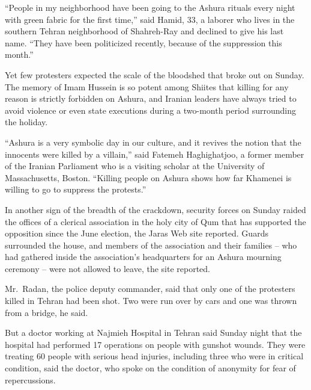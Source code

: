 ﻿\documentclass[12pt]{article}
\begin{document}
``People in my neighborhood have been going to the Ashura rituals every night with green fabric for
the first time,'' said Hamid, 33, a laborer who lives in the southern Tehran neighborhood of
Shahreh-Ray and declined to give his last name. ``They have been politicized recently, because of
the suppression this month.''

Yet few protesters expected the scale of the bloodshed that broke out on Sunday. The memory of Imam
Hussein is so potent among Shiites that killing for any reason is strictly forbidden on Ashura, and
Iranian leaders have always tried to avoid violence or even state executions during a two-month
period surrounding the holiday.

``Ashura is a very symbolic day in our culture, and it revives the notion that the innocents were
killed by a villain,'' said Fatemeh Haghighatjoo, a former member of the Iranian Parliament who is a
visiting scholar at the University of Massachusetts, Boston. ``Killing people on Ashura shows how
far Khamenei is willing to go to suppress the protests.''

In another sign of the breadth of the crackdown, security forces on Sunday raided the offices of a
clerical association in the holy city of Qum that has supported the opposition since the June
election, the Jaras Web site reported. Guards surrounded the house, and members of the association
and their families -- who had gathered inside the association's headquarters for an Ashura mourning
ceremony -- were not allowed to leave, the site reported.

Mr.~Radan, the police deputy commander, said that only one of the protesters killed in Tehran had
been shot. Two were run over by cars and one was thrown from a bridge, he said.

But a doctor working at Najmieh Hospital in Tehran said Sunday night that the hospital had performed
17 operations on people with gunshot wounds. They were treating 60 people with serious head
injuries, including three who were in critical condition, said the doctor, who spoke on the
condition of anonymity for fear of repercussions.

\vocabulary
\end{document}
